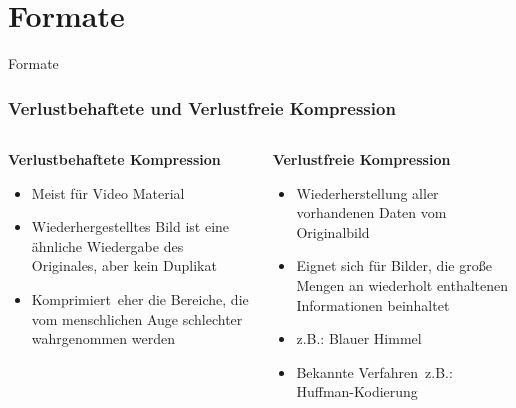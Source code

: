 \documentclass{beamer}
\begin{document}
	\section{Formate}
	\begin{frame}
		\begin{center}
			\Huge Formate
		\end{center}
	\end{frame}
	\begin{frame}
	\frametitle{Verlustbehaftete und Verlustfreie Kompression}
	\begin{columns}
		\begin{column}{0.5\textwidth}
			\textbf{Verlustbehaftete Kompression}
			\begin{itemize}[label=\textcolor{red!65!black}{\textbullet}]
				\item Meist für Video Material
				\item Wiederhergestelltes Bild ist eine ähnliche Wiedergabe des Originales, aber kein Duplikat
				\item Komprimiert eher die Bereiche, die vom menschlichen Auge schlechter wahrgenommen werden
			\end{itemize}
		\end{column}
		\begin{column}{0.5\textwidth}
			\textbf{Verlustfreie Kompression}
			\begin{itemize}[label=\textcolor{red!65!black}{\textbullet}]
				\item Wiederherstellung aller vorhandenen Daten vom Originalbild
				\item Eignet sich für Bilder, die große Mengen an wiederholt enthaltenen Informationen beinhaltet
				\item z.B.: Blauer Himmel
				\item Bekannte Verfahren z.B.: Huffman-Kodierung
			\end{itemize}
		\end{column}
	\end{columns}
	\end{frame}
\end{document}
